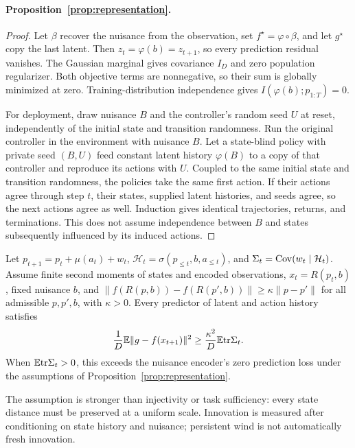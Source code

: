 \paragraph{Proposition~\ref{prop:representation}.}
\begin{proof}
Let $\beta$ recover the nuisance from the observation, set $f^\star=\varphi\circ\beta$, and let
$g^\star$ copy the last latent. Then $z_t=\varphi(b)=z_{t+1}$, so every prediction residual vanishes.
The Gaussian marginal gives covariance $I_D$ and zero population regularizer. Both objective terms
are nonnegative, so their sum is globally minimized at zero. Training-distribution independence
gives $I(\varphi(b);p_{1:T})=0$.

For deployment, draw nuisance $B$ and the controller's random seed $U$ at reset, independently of
the initial state and transition randomness. Run the original controller in the environment with
nuisance $B$. Let a state-blind policy with private seed $(B,U)$ feed constant latent history
$\varphi(B)$ to a copy of that controller and reproduce its actions with $U$. Coupled to the same
initial state and transition randomness, the policies take the same first action. If their actions
agree through step $t$, their states, supplied latent histories, and seeds agree, so the next actions
agree as well. Induction gives identical trajectories, returns, and terminations. This does not
assume independence between $B$ and states subsequently influenced by its induced actions.
\end{proof}

\begin{corollary}
\label{cor:strict}
Let $p_{t+1}=p_t+\mu(a_t)+w_t$, $\mathcal H_t=\sigma(p_{\le t},b,a_{\le t})$, and
$\Sigma_t=\mathrm{Cov}(w_t\mid\mathcal H_t)$. Assume finite second moments of states and encoded observations,
$x_t=R(p_t,b)$, fixed nuisance $b$, and
$\|f(R(p,b))-f(R(p',b))\|\ge\kappa\|p-p'\|$ for all admissible $p,p',b$, with $\kappa>0$.
Every predictor of latent and action history satisfies
\begin{equation}
\label{eq:innovation}
\frac1D\mathbb{E}\|g-f(x_{t+1})\|^2\ge\frac{\kappa^2}{D}\mathbb{E}\mathrm{tr}\Sigma_t.
\end{equation}
When $\mathbb{E}\mathrm{tr}\Sigma_t>0$, this exceeds the nuisance encoder's zero prediction loss under the
assumptions of Proposition~\ref{prop:representation}.
\end{corollary}
The assumption is stronger than injectivity or task sufficiency: every state distance must be
preserved at a uniform scale. Innovation is measured after conditioning on state history and nuisance;
persistent wind is not automatically fresh innovation.

